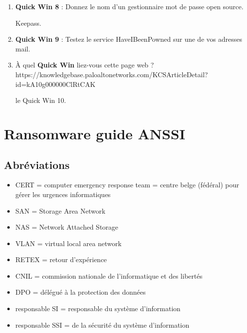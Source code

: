 \documentclass[a4paper]{article}
\begin{document}
\begin{enumerate}
\item \textbf{Quick Win 8} : Donnez le nom d'un gestionnaire mot de passe open source.
\begin{example}
    Keepass.
\end{example}



\item \textbf{Quick Win 9} : Testez le service HaveIBeenPowned sur une de vos adresses mail.



\item À quel \textbf{Quick Win} liez-vous cette page web ? \\
https://knowledgebase.paloaltonetworks.com/KCSArticleDetail?id=kA10g000000ClRtCAK
\begin{example}
    le Quick Win 10.
\end{example}



\end{enumerate}















\section{Ransomware guide ANSSI}










\subsection{Abréviations}





\begin{itemize}
    \item CERT = computer emergency response team = centre belge (fédéral) pour gérer les urgences informatiques
    \item SAN = Storage Area Network
    \item NAS = Network Attached Storage
    \item VLAN = virtual local area network
    \item RETEX = retour d'expérience
    \item CNIL = commission nationale de l’informatique et des libertés
    \item DPO = délégué à la protection des données
    \item responsable SI = responsable du système d'information
    \item responsable SSI = de la sécurité du système d'information
\end{itemize}
\end{document}
